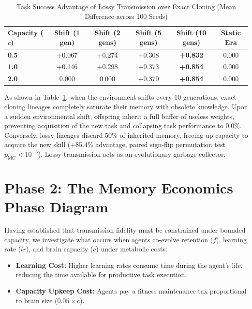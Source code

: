 \documentclass[11pt,a4paper]{article}
\begin{document}
\begin{table}[h]
\centering
\caption{Task Success Advantage of Lossy Transmission over Exact Cloning (Mean Difference across 100 Seeds)}
\label{tab:capacity_trap}
\vspace{0.2cm}
\begin{tabular}{lccccc}
\toprule
\textbf{Capacity ($c$)} & \textbf{Shift (1 gen)} & \textbf{Shift (2 gens)} & \textbf{Shift (5 gens)} & \textbf{Shift (10 gens)} & \textbf{Static Era} \\
\midrule
\textbf{0.5} & +0.067 & +0.274 & +0.308 & \textbf{+0.832} & 0.000 \\
\textbf{1.0} & +0.146 & +0.298 & +0.373 & \textbf{+0.854} & 0.000 \\
\textbf{2.0} & 0.000  & 0.000  & +0.370 & \textbf{+0.854} & 0.000 \\
\bottomrule
\end{tabular}
\end{table}

As shown in Table~\ref{tab:capacity_trap}, when the environment shifts every 10 generations, exact-cloning lineages completely saturate their memory with obsolete knowledge. Upon a sudden environmental shift, offspring inherit a full buffer of useless weights, preventing acquisition of the new task and collapsing task performance to 0.0\%. Conversely, lossy lineages discard 50\% of inherited memory, freeing up capacity to acquire the new skill (+85.4\% advantage, paired sign-flip permutation test $p_{\mathrm{MC}} < 10^{-5}$). Lossy transmission acts as an evolutionary garbage collector.

\section{Phase 2: The Memory Economics Phase Diagram}
Having established that transmission fidelity must be constrained under bounded capacity, we investigate what occurs when agents co-evolve retention ($f$), learning rate ($lr$), and brain capacity ($c$) under metabolic costs:
\begin{itemize}
    \item \textbf{Learning Cost:} Higher learning rates consume time during the agent's life, reducing the time available for productive task execution.
    \item \textbf{Capacity Upkeep Cost:} Agents pay a fitness maintenance tax proportional to brain size ($0.05 \times c$).
\end{itemize}
\end{document}

